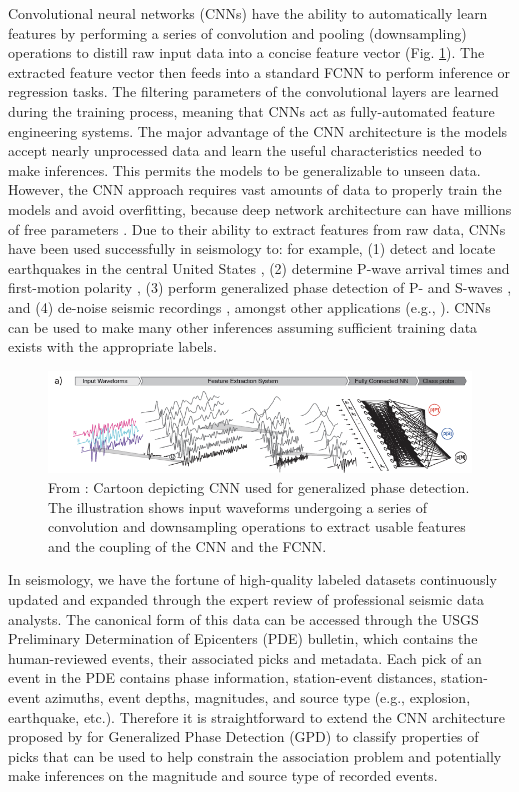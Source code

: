 \documentclass[12p]{article}
\begin{document}
Convolutional neural networks (CNNs) have the ability to automatically learn features by performing a series of
convolution and pooling (downsampling) operations to distill raw input data into a concise feature vector (Fig.
\ref{fig:cnn}). The extracted feature vector then feeds into a standard FCNN to perform inference or regression tasks.
The filtering parameters of the convolutional layers are learned during the training process, meaning that CNNs act as
fully-automated feature engineering systems. The major advantage of the CNN architecture is the models accept nearly
unprocessed data and learn the useful characteristics needed to make inferences. This permits the models to be
generalizable to unseen data. However, the CNN approach requires vast amounts of data to properly train the models and
avoid overfitting, because deep network architecture can have millions of free parameters \citep{Ross2018a}. Due to
their ability to extract features from raw data, CNNs have been used successfully in seismology to: for example, (1)
detect and locate earthquakes in the central United States \citep{Perol2018}, (2) determine P-wave arrival times and
first-motion polarity \citep{Ross2018a}, (3) perform generalized phase detection of P- and S-waves \citep{Ross2018b,
Zhu2019a}, and (4) de-noise seismic recordings \cite{Zhu2019b}, amongst other applications (e.g., \citet{RouetLeduc2017,
RouetLeduc2019}). CNNs can be used to make many other inferences assuming sufficient training data exists with the
appropriate labels.

\begin{figure}[!htb]
  \center\includegraphics[width=\textwidth]{figures/cnn_architecture_ross2018a.png}
  \caption{\label{fig:cnn} From \cite{Ross2018b}: Cartoon depicting CNN used for generalized phase detection. The illustration shows input waveforms undergoing a series of convolution and downsampling operations to extract usable features and the coupling of the CNN and the FCNN.}
\end{figure}

In seismology, we have the fortune of high-quality labeled datasets continuously updated and expanded through the expert review of professional seismic data analysts. The canonical form of this data can be accessed through the USGS Preliminary Determination of Epicenters (PDE) bulletin, which contains the human-reviewed events, their associated picks and metadata. Each pick of an event in the PDE contains phase information, station-event distances, station-event azimuths, event depths, magnitudes, and source type (e.g., explosion, earthquake, etc.). Therefore it is straightforward to extend the CNN architecture proposed by \citet{Ross2018b} for Generalized Phase Detection (GPD) to classify properties of picks that can be used to help constrain the association problem and potentially make inferences on the magnitude and source type of recorded events.
\end{document}
